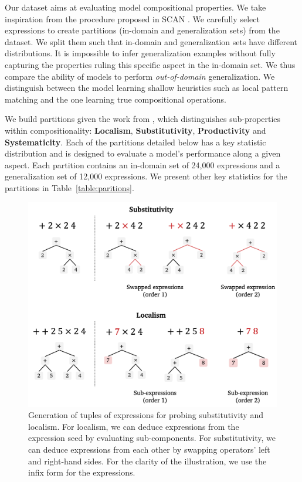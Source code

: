 Our dataset aims at evaluating model compositional properties. We take inspiration from the procedure proposed in SCAN \parencite{lake_18, loula_18}. We carefully select expressions to create partitions (in-domain and generalization sets) from the dataset. We split them such that in-domain and generalization sets have different distributions. It is impossible to infer generalization examples without fully capturing the properties ruling this specific aspect in the in-domain set. We thus compare the ability of models to perform \textit{out-of-domain} generalization. We distinguish between the model learning shallow heuristics such as local pattern matching and the one learning true compositional operations.

We build partitions given the work from \textcite{hupkes_20}, which distinguishes sub-properties within compositionality: \textbf{Localism}, \textbf{Substitutivity}, \textbf{Productivity} and \textbf{Systematicity}. Each of the partitions detailed below has a key statistic distribution and is designed to evaluate a model's performance along a given aspect. Each partition contains an in-domain set of 24,000 expressions and a generalization set of 12,000 expressions. We present other key statistics for the partitions in Table~\ref{table:paritions}. 

\begin{figure}[htb!]
    \centering
    \includegraphics[width=\textwidth]{images/loc_prod_6.png}
    \caption{Generation of tuples of expressions for probing substitutivity and localism. For localism, we can deduce expressions from the expression seed by evaluating sub-components. For substitutivity, we can deduce expressions from each other by swapping operators' left and right-hand sides. For the clarity of the illustration, we use the infix form for the expressions.}
\end{figure}

